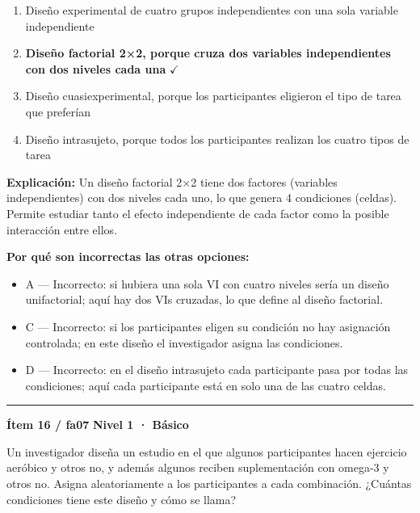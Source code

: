 \documentclass[12pt,a4paper]{article}
\begin{document}
\begin{enumerate}
  \item[A.] Diseño experimental de cuatro grupos independientes con una sola variable independiente
  \item[\textbf{\color{verde}B.}] \textbf{\color{verde} Diseño factorial 2×2, porque cruza dos variables independientes con dos niveles cada una} \hfill $\checkmark$
  \item[C.] Diseño cuasiexperimental, porque los participantes eligieron el tipo de tarea que preferían
  \item[D.] Diseño intrasujeto, porque todos los participantes realizan los cuatro tipos de tarea
\end{enumerate}

\noindent\textbf{\color{azul}Explicación:} Un diseño factorial 2×2 tiene dos factores (variables independientes) con dos niveles cada uno, lo que genera 4 condiciones (celdas). Permite estudiar tanto el efecto independiente de cada factor como la posible interacción entre ellos.

\noindent\textbf{\color{gris}Por qué son incorrectas las otras opciones:}
\begin{itemize}
  \item {\small A — Incorrecto: si hubiera una sola VI con cuatro niveles sería un diseño unifactorial; aquí hay dos VIs cruzadas, lo que define al diseño factorial.}
  \item {\small C — Incorrecto: si los participantes eligen su condición no hay asignación controlada; en este diseño el investigador asigna las condiciones.}
  \item {\small D — Incorrecto: en el diseño intrasujeto cada participante pasa por todas las condiciones; aquí cada participante está en solo una de las cuatro celdas.}
\end{itemize}
\vspace{8pt}\hrule\vspace{10pt}

\begin{mdframed}[backgroundcolor=fondogris,linecolor=azul,linewidth=1pt,innerleftmargin=10pt,innerrightmargin=10pt,innertopmargin=7pt,innerbottommargin=7pt]
\textbf{Ítem 16 / fa07} \hfill {\small\bfseries\color{azul} Nivel 1 · Básico}
\end{mdframed}

Un investigador diseña un estudio en el que algunos participantes hacen ejercicio aeróbico y otros no, y además algunos reciben suplementación con omega-3 y otros no. Asigna aleatoriamente a los participantes a cada combinación. ¿Cuántas condiciones tiene este diseño y cómo se llama?
\end{document}
